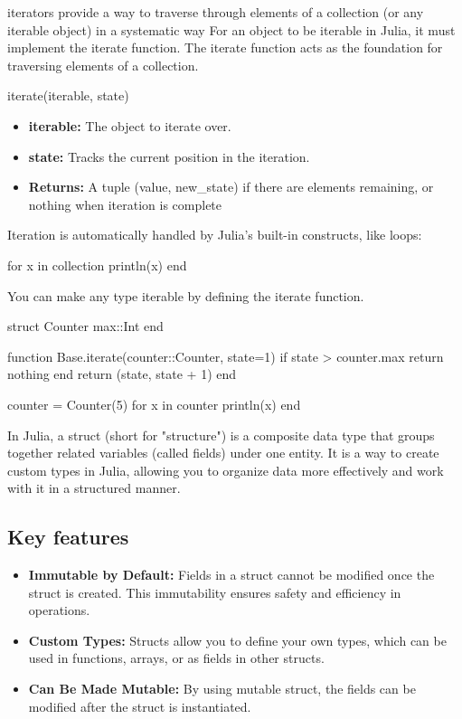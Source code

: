 \documentclass{report}
\begin{document}
     \pagebreak 
     \bigbreak \noindent
     iterators provide a way to traverse through elements of a collection (or any iterable object) in a systematic way
     \bigbreak \noindent 
     For an object to be iterable in Julia, it must implement the iterate function. The iterate function acts as the foundation for traversing elements of a collection.
     \bigbreak \noindent 
     \begin{jlcode}
     iterate(iterable, state)
     \end{jlcode}
     \begin{itemize}
         \item \textbf{iterable:} The object to iterate over.
         \item \textbf{state:} Tracks the current position in the iteration.
         \item \textbf{Returns:} A tuple (value, new\_state) if there are elements remaining, or nothing when iteration is complete
     \end{itemize}
     \bigbreak \noindent 
     Iteration is automatically handled by Julia's built-in constructs, like loops:
     \bigbreak \noindent 
     \begin{jlcode}
         for x in collection
             println(x)
         end
     \end{jlcode}
     \bigbreak \noindent 
     You can make any type iterable by defining the iterate function.
     \bigbreak \noindent 
     \begin{jlcode}
 struct Counter
    max::Int
end

function Base.iterate(counter::Counter, state=1)
    if state > counter.max
        return nothing
    end
    return (state, state + 1)
end

counter = Counter(5)
for x in counter
    println(x)
end
     \end{jlcode}

     \pagebreak 
     \bigbreak \noindent 
     In Julia, a struct (short for "structure") is a composite data type that groups together related variables (called fields) under one entity. It is a way to create custom types in Julia, allowing you to organize data more effectively and work with it in a structured manner.
     \bigbreak \noindent 
     \subsection{Key features}
     \bigbreak \noindent 
     \begin{itemize}
         \item \textbf{Immutable by Default:} Fields in a struct cannot be modified once the struct is created. This immutability ensures safety and efficiency in operations.
         \item \textbf{Custom Types:} Structs allow you to define your own types, which can be used in functions, arrays, or as fields in other structs.
         \item \textbf{Can Be Made Mutable:} By using mutable struct, the fields can be modified after the struct is instantiated.
     \end{itemize}
\end{document}

